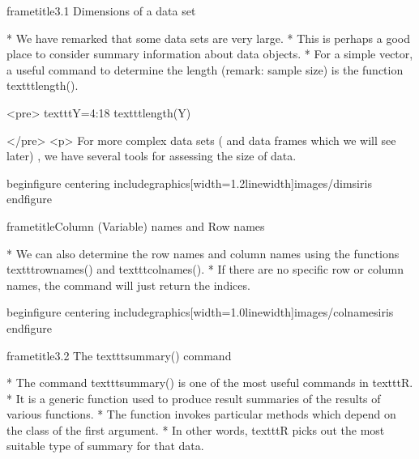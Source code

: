  	
 	
 		
 		frametitle{3.1 Dimensions of a data set}
 		
 			         * We have remarked that some data sets are very large. 
 			         * This is perhaps a good place to consider
 			summary information about data objects. 
 			         * For a simple vector, a useful command to determine
 			the length (remark: sample size) is the function texttt{length()}.
 		
 		<pre>
 			texttt{Y=4:18}
 			texttt{length(Y)}
 			
 		</pre>
<p>
 		For more complex data sets ( and data frames which we will see later) , we have several
 		tools for assessing the size of data.
 	
 	
 		begin{figure}
 			centering
 			includegraphics[width=1.2linewidth]{images/dimsiris}
 		end{figure}
 		
 		
 		
 	
 	
 		frametitle{Column (Variable) names and Row names}
 		
 			         * We can also determine the row names and column names using the functions texttt{rownames()}
 			and texttt{colnames()}. 
 			         * If there are no specific row or column names, the command will just return
 			the indices.
 		
 		begin{figure}
 			centering
 			includegraphics[width=1.0linewidth]{images/colnamesiris}
 		end{figure}
 		
 	
 	
 		frametitle{3.2 The texttt{summary()} command}
 		
 			         * The command texttt{summary()} is one of the most useful commands in texttt{R}. 
 			         * It is a generic function used
 			to produce result summaries of the results of various functions. 
 			         * The function invokes particular
 			methods which depend on the class of the first argument. 
 			         * In other words, texttt{R} picks out the most
 			suitable type of summary for that data.
 		
